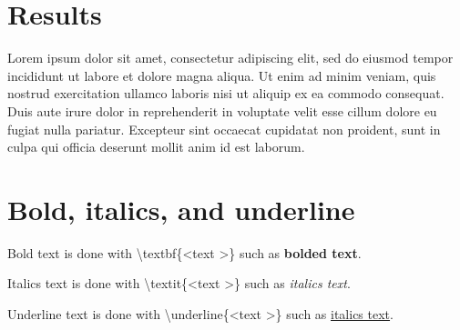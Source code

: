 \documentclass[10pt, letterpaper, twoside]{article}
\begin{document}
\section{Results}
\label{sec:results}
Lorem ipsum dolor sit amet, consectetur adipiscing elit, sed do eiusmod tempor incididunt ut labore et dolore magna aliqua. Ut enim ad minim veniam, quis nostrud exercitation ullamco laboris nisi ut aliquip ex ea commodo consequat. Duis aute irure dolor in reprehenderit in voluptate velit esse cillum dolore eu fugiat nulla pariatur. Excepteur sint occaecat cupidatat non proident, sunt in culpa qui officia deserunt mollit anim id est laborum.

\section{Bold, italics, and underline}
\label{sec:bold_italics_underline}
Bold text is done with \textbackslash{textbf\{\textless text \textgreater\}} such as \textbf{bolded text}.

Italics text is done with \textbackslash{textit\{\textless text \textgreater\}} such as \textit{italics text}.

Underline text is done with \textbackslash{underline\{\textless text \textgreater\}} such as \underline{italics text}.
\end{document}
